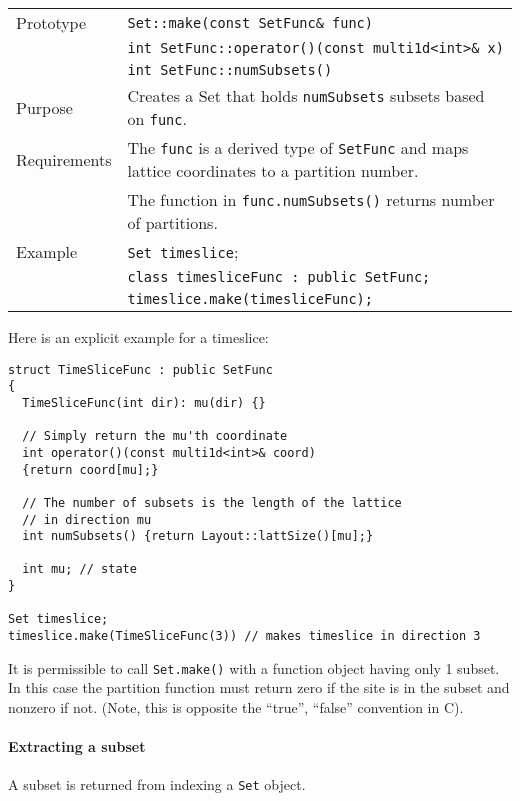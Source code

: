 \documentclass[12pt,letterpaper]{article}
\begin{document}
\begin{flushleft}
\begin{tabular}{|l|p{5.0in}|}
\hline
Prototype    & \verb|Set::make(const SetFunc& func)|\\
             & \verb|int SetFunc::operator()(const multi1d<int>& x)|\\
             & \verb|int SetFunc::numSubsets()|\\
\hline
Purpose      & Creates a Set that holds \verb|numSubsets| subsets based on \verb|func|.\\
\hline
Requirements & The \verb|func| is a derived type of \verb|SetFunc| and
               maps lattice coordinates to a partition number.\\
             & The function in \verb|func.numSubsets()| returns number of partitions.\\
\hline
Example  & \verb|Set timeslice|; \\
         & \verb|class timesliceFunc : public SetFunc;| \\
         & \verb|timeslice.make(timesliceFunc);| \\
   \hline
  \end{tabular}
\end{flushleft}
%
Here is an explicit example for a timeslice:
%
\begin{verbatim}
struct TimeSliceFunc : public SetFunc
{
  TimeSliceFunc(int dir): mu(dir) {}

  // Simply return the mu'th coordinate
  int operator()(const multi1d<int>& coord)
  {return coord[mu];}

  // The number of subsets is the length of the lattice
  // in direction mu
  int numSubsets() {return Layout::lattSize()[mu];}

  int mu; // state
}

Set timeslice;
timeslice.make(TimeSliceFunc(3)) // makes timeslice in direction 3
\end{verbatim}

It is permissible to call \verb|Set.make()| with a function object
having only 1 subset.  In this case the partition function must return
zero if the site is in the subset and nonzero if not.  (Note, this is
opposite the ``true'', ``false'' convention in C).

\paragraph{Extracting a subset}

A subset is returned from indexing a \verb|Set| object.
\end{document}
